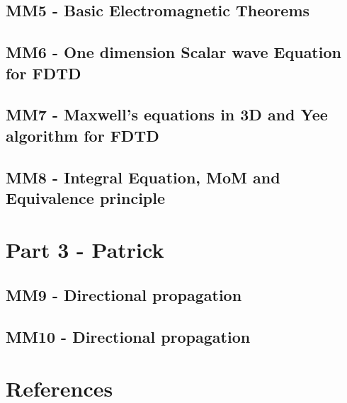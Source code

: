 \chapter{MM5 - Basic Electromagnetic Theorems}




\chapter{MM6 - One dimension Scalar wave Equation for FDTD}




\chapter{MM7 - Maxwell’s equations in 3D and Yee algorithm for FDTD}




\chapter{MM8 - Integral Equation, MoM and Equivalence principle}




\part{Part 3 - Patrick}

\chapter{MM9 - Directional propagation}




\chapter{MM10 - Directional propagation}




\part{References}






